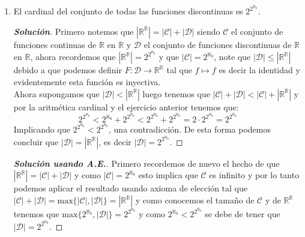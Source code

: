 \documentclass[11pt]{article}
\numberwithin{equation}{section}
\numberwithin{figure}{section}
\begin{document}
\begin{enumerate}
\begin{proof}[\textbf{Solución}]
    \begin{equation*}
    2^{2^{\aleph_0}}\leq(2^{2^{\aleph_0}})^n\leq(2^{2^{\aleph_0}})^{\aleph_0}\leq(2^{2^{\aleph_0}})^{2^{\aleph_0}}=2^{2^{\aleph_0}\cdot2^{\aleph_0}}=2^{2^{\aleph_0}}   
    \end{equation*}
    Luego por el teorema de Cantor-Bernstein y el hecho de que la cardinalidad es una relación de equivalencia se obtiene el resultado.
   \end{proof}
   \item El cardinal del conjunto de todas las funciones discontinuas es $2^{2^{\aleph_0}}$.
    \begin{proof}[\textbf{Solución}]
   Primero notemos que $|\mathbb{R}^\mathbb{R}|=|\mathcal{C}|+|\mathcal{D}|$ siendo $\mathcal{C}$ el conjunto de funciones continuas de $\mathbb{R}$ en $\mathbb{R}$ y $\mathcal{D}$ el conjunto de funciones discontinuas de $\mathbb{R}$ en $\mathbb{R}$, ahora recordemos que $|\mathbb{R}^\mathbb{R}|=2^{2^{\aleph_0}}$ y que $|\mathcal{C}|=2^{\aleph_0}$, note que $|\mathcal{D}|\leq|\mathbb{R}^\mathbb{R}|$ debido a que podemos definir $F:\mathcal{D}\longrightarrow\mathbb{R}^\mathbb{R}$ tal que $f\longmapsto f$ es decir la identidad y evidentemente esta función es inyectiva.\\
   Ahora supongamos que $|\mathcal{D}|<|\mathbb{R}^\mathbb{R}|$ luego tenemos que $|\mathcal{C}|+|\mathcal{D}|<|\mathcal{C}|+|\mathbb{R}^\mathbb{R}|$ y por la aritmética cardinal y el ejercicio anterior tenemos que:
   \begin{equation*}
       2^{2^{\aleph_0}}<2^{\aleph_0}+2^{2^{\aleph_0}}<2^{2^{\aleph_0}}+2^{2^{\aleph_0}}=2\cdot2^{2^{\aleph_0}}=2^{2^{\aleph_0}}
   \end{equation*}
   Implicando que $2^{2^{\aleph_0}}<2^{2^{\aleph_0}}$, una contradicción. De esta forma podemos concluir que $|\mathcal{D}|=|\mathbb{R}^\mathbb{R}|$, es decir $|\mathcal{D}|=2^{2^{\aleph_0}}$.
   \end{proof}
   \begin{proof}[\textbf{Solución usando A.E.}]
   Primero recordemos de nuevo el hecho de que $|\mathbb{R}^\mathbb{R}|=|\mathcal{C}|+|\mathcal{D}|$ y como $|\mathcal{C}|=2^{\aleph_0}$ esto implica que $\mathcal{C}$ es infinito y por lo tanto podemos aplicar el resultado usando axioma de elección tal que $|\mathcal{C}|+|\mathcal{D}|=\text{max}\{|\mathcal{C}|,|\mathcal{D}|\}=|\mathbb{R}^\mathbb{R}|$ y como conocemos el tamaño de $\mathcal{C}$ y de $\mathbb{R}^\mathbb{R}$ tenemos que $\text{max}\{2^{\aleph_0},|\mathcal{D}|\}=2^{2^{\aleph_0}}$ y como $2^{\aleph_0}<2^{2^{\aleph_0}}$ se debe de tener que $|\mathcal{D}|=2^{2^{\aleph_0}}$. 

\end{proof}
\end{enumerate}
\end{document}
